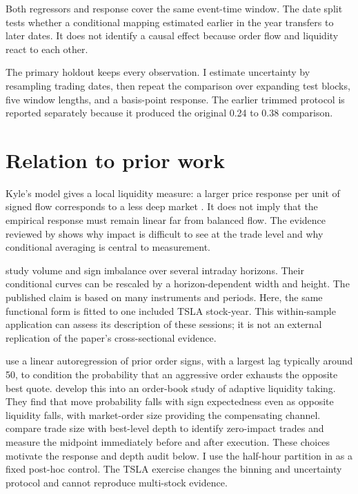 \documentclass[11pt,a4paper]{article}
\begin{document}
Both regressors and response cover the same event-time window. The date split
tests whether a conditional mapping estimated earlier in the year transfers to
later dates. It does not identify a causal effect because order flow and
liquidity react to each other.

The primary holdout keeps every observation. I estimate uncertainty by
resampling trading dates, then repeat the comparison over expanding test blocks,
five window lengths, and a basis-point response. The earlier trimmed protocol is
reported separately because it produced the original 0.24 to 0.38 comparison.

\section{Relation to prior work}

Kyle's model gives a local liquidity measure: a larger price response per unit
of signed flow corresponds to a less deep market
\citep{kyle1985}. It does not imply that the empirical response must remain
linear far from balanced flow. The evidence reviewed by \citet{bouchaud2018}
shows why impact is difficult to see at the trade level and why conditional
averaging is central to measurement.

\citet{patzelt2018} study volume and sign imbalance over several intraday
horizons. Their conditional curves can be rescaled by a horizon-dependent width
and height. The published claim is based on many instruments and periods. Here,
the same functional form is fitted to one included TSLA stock-year. This
within-sample application can assess its description of these sessions; it is
not an external replication of the paper's cross-sectional evidence.

\citet{lillo2004} use a linear autoregression of prior order signs, with a
largest lag typically around 50, to condition the probability that an
aggressive order exhausts the opposite best quote. \citet{taranto2014} develop
this into an order-book study of adaptive liquidity taking. They find that move
probability falls with sign expectedness even as opposite liquidity falls, with
market-order size providing the compensating channel. \citet{pham2020} compare
trade size with best-level depth to identify zero-impact trades and measure the
midpoint immediately before and after execution. These choices motivate the
response and depth audit below. I use the half-hour partition in
\citet{cont2014} as a fixed post-hoc control. The TSLA exercise changes the
binning and uncertainty protocol and cannot reproduce multi-stock evidence.
\end{document}
